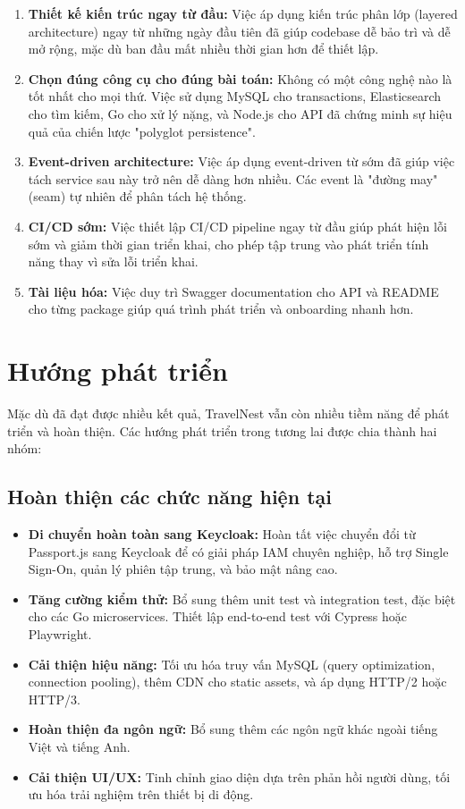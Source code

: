 \documentclass[13pt,a4paper,twoside]{report}
\begin{document}
\begin{enumerate}
  \item \textbf{Thiết kế kiến trúc ngay từ đầu:} Việc áp dụng kiến trúc phân lớp (layered architecture) ngay từ những ngày đầu tiên đã giúp codebase dễ bảo trì và dễ mở rộng, mặc dù ban đầu mất nhiều thời gian hơn để thiết lập.
  \item \textbf{Chọn đúng công cụ cho đúng bài toán:} Không có một công nghệ nào là tốt nhất cho mọi thứ. Việc sử dụng MySQL cho transactions, Elasticsearch cho tìm kiếm, Go cho xử lý nặng, và Node.js cho API đã chứng minh sự hiệu quả của chiến lược "polyglot persistence".
  \item \textbf{Event-driven architecture:} Việc áp dụng event-driven từ sớm đã giúp việc tách service sau này trở nên dễ dàng hơn nhiều. Các event là "đường may" (seam) tự nhiên để phân tách hệ thống.
  \item \textbf{CI/CD sớm:} Việc thiết lập CI/CD pipeline ngay từ đầu giúp phát hiện lỗi sớm và giảm thời gian triển khai, cho phép tập trung vào phát triển tính năng thay vì sửa lỗi triển khai.
  \item \textbf{Tài liệu hóa:} Việc duy trì Swagger documentation cho API và README cho từng package giúp quá trình phát triển và onboarding nhanh hơn.
\end{enumerate}

\section{Hướng phát triển}

Mặc dù đã đạt được nhiều kết quả, TravelNest vẫn còn nhiều tiềm năng để phát triển và hoàn thiện. Các hướng phát triển trong tương lai được chia thành hai nhóm:

\subsection{Hoàn thiện các chức năng hiện tại}

\begin{itemize}
  \item \textbf{Di chuyển hoàn toàn sang Keycloak:} Hoàn tất việc chuyển đổi từ Passport.js sang Keycloak để có giải pháp IAM chuyên nghiệp, hỗ trợ Single Sign-On, quản lý phiên tập trung, và bảo mật nâng cao.
  \item \textbf{Tăng cường kiểm thử:} Bổ sung thêm unit test và integration test, đặc biệt cho các Go microservices. Thiết lập end-to-end test với Cypress hoặc Playwright.
  \item \textbf{Cải thiện hiệu năng:} Tối ưu hóa truy vấn MySQL (query optimization, connection pooling), thêm CDN cho static assets, và áp dụng HTTP/2 hoặc HTTP/3.
  \item \textbf{Hoàn thiện đa ngôn ngữ:} Bổ sung thêm các ngôn ngữ khác ngoài tiếng Việt và tiếng Anh.
  \item \textbf{Cải thiện UI/UX:} Tinh chỉnh giao diện dựa trên phản hồi người dùng, tối ưu hóa trải nghiệm trên thiết bị di động.
\end{itemize}
\end{document}

